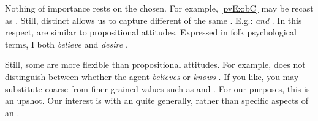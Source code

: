\begin{note}
    \noindent%
    Nothing of importance rests on the  chosen.
    For example, \ref{pvEx:bC} may be recast as .
    Still, distinct  allows us to capture different  of the same .
    E.g.:  \emph{and} .
    In this respect, \evalN{} are similar to propositional attitudes.
    Expressed in folk psychological terms, I both \emph{believe}  and \emph{desire} .

    Still, some  are more flexible than propositional attitudes.
    For example,  does not distinguish between whether the agent \emph{believes} or \emph{knows} .
    If you like, you may substitute coarse  from finer-grained values such as  and .
    For our purposes, this is an upshot.
    Our interest is with an \agpe{} quite generally, rather than specific aspects of an \agpe{}.
  \end{note}

